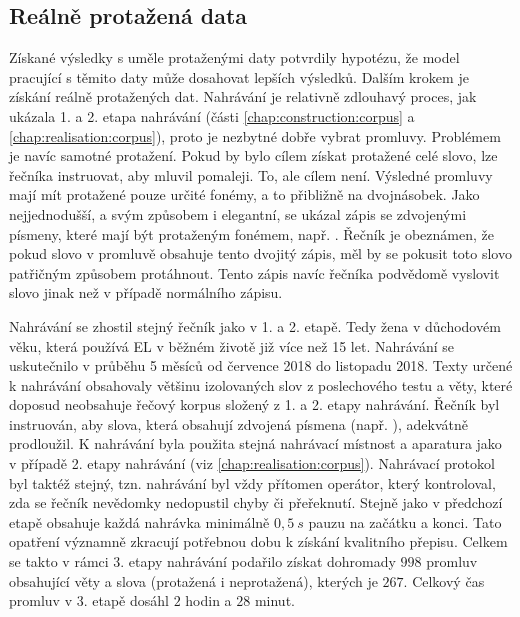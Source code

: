 
\subsection{Reálně protažená data}
\label{chap:realisation:augmentation:real}

Získané výsledky s uměle protaženými daty potvrdily hypotézu, že model pracující s těmito daty může dosahovat lepších výsledků. Dalším krokem je získání reálně protažených dat. Nahrávání je relativně zdlouhavý proces, jak ukázala 1. a 2. etapa nahrávání (části \ref{chap:construction:corpus} a \ref{chap:realisation:corpus}), proto je nezbytné dobře vybrat promluvy. Problémem je navíc samotné protažení. Pokud by bylo cílem získat protažené celé slovo, lze řečníka instruovat, aby mluvil pomaleji. To, ale cílem není. Výsledné promluvy mají mít protažené pouze určité fonémy, a to přibližně na dvojnásobek. Jako nejjednodušší, a svým způsobem i elegantní, se ukázal zápis se zdvojenými písmeny, které mají být protaženým fonémem, např. . Řečník je obeznámen, že pokud slovo v promluvě obsahuje tento dvojitý zápis, měl by se pokusit toto slovo patřičným způsobem protáhnout. Tento zápis navíc řečníka podvědomě  vyslovit slovo jinak než v případě normálního zápisu.

Nahrávání se zhostil stejný řečník jako v 1. a 2. etapě. Tedy žena v důchodovém věku, která používá EL v běžném životě již více než 15 let. Nahrávání se uskutečnilo v průběhu 5 měsíců od července 2018 do listopadu 2018. Texty určené k nahrávání obsahovaly většinu izolovaných slov z poslechového testu a věty, které doposud neobsahuje řečový korpus složený z 1. a 2. etapy nahrávání. Řečník byl instruován, aby slova, která obsahují zdvojená písmena (např. ), adekvátně prodloužil. K nahrávání byla použita stejná nahrávací místnost a aparatura jako v případě 2. etapy nahrávání (viz \ref{chap:realisation:corpus}). Nahrávací protokol byl taktéž stejný, tzn. nahrávání byl vždy přítomen operátor, který kontroloval, zda se řečník nevědomky nedopustil chyby či přeřeknutí. Stejně jako v předchozí etapě obsahuje každá nahrávka minimálně $0,5\ s$ pauzu na začátku a konci. Tato opatření významně zkracují potřebnou dobu k získání kvalitního přepisu.
Celkem se takto v rámci 3. etapy nahrávání podařilo získat dohromady $998$ promluv obsahující věty a slova (protažená i neprotažená), kterých je $267$. Celkový čas promluv v 3. etapě dosáhl $2$ hodin a $28$ minut.

